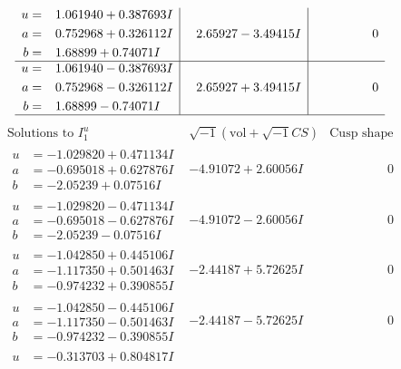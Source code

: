\documentclass[1p]{elsarticle_modified}
\theoremstyle{definition}
\newcommand{\I}{\sqrt{-1}}
\begin{document}
$$\begin{array}{c|c|c}
\begin{aligned}
u &= \phantom{-}1.061940 + 0.387693 I \\
a &= \phantom{-}0.752968 + 0.326112 I \\
b &= \phantom{-}1.68899 + 0.74071 I\end{aligned}
 & \phantom{-}2.65927 - 3.49415 I & \phantom{-0.000000 } 0 \\ \hline\begin{aligned}
u &= \phantom{-}1.061940 - 0.387693 I \\
a &= \phantom{-}0.752968 - 0.326112 I \\
b &= \phantom{-}1.68899 - 0.74071 I\end{aligned}
 & \phantom{-}2.65927 + 3.49415 I & \phantom{-0.000000 } 0\\
 \hline 
 \end{array}$$\newpage$$\begin{array}{c|c|c}  
\text{Solutions to }I^u_{1}& \I (\text{vol} + \sqrt{-1}CS) & \text{Cusp shape}\\
 \hline 
\begin{aligned}
u &= -1.029820 + 0.471134 I \\
a &= -0.695018 + 0.627876 I \\
b &= -2.05239 + 0.07516 I\end{aligned}
 & -4.91072 + 2.60056 I & \phantom{-0.000000 } 0 \\ \hline\begin{aligned}
u &= -1.029820 - 0.471134 I \\
a &= -0.695018 - 0.627876 I \\
b &= -2.05239 - 0.07516 I\end{aligned}
 & -4.91072 - 2.60056 I & \phantom{-0.000000 } 0 \\ \hline\begin{aligned}
u &= -1.042850 + 0.445106 I \\
a &= -1.117350 + 0.501463 I \\
b &= -0.974232 + 0.390855 I\end{aligned}
 & -2.44187 + 5.72625 I & \phantom{-0.000000 } 0 \\ \hline\begin{aligned}
u &= -1.042850 - 0.445106 I \\
a &= -1.117350 - 0.501463 I \\
b &= -0.974232 - 0.390855 I\end{aligned}
 & -2.44187 - 5.72625 I & \phantom{-0.000000 } 0 \\ \hline\begin{aligned}
u &= -0.313703 + 0.804817 I \\

\end{aligned}
\end{array}$$
\end{document}
